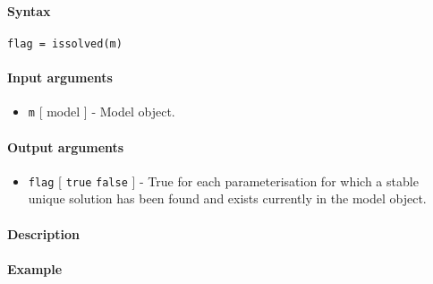 


	\paragraph{Syntax}

\begin{verbatim}
flag = issolved(m)
\end{verbatim}

\paragraph{Input arguments}

\begin{itemize}
\itemsep1pt\parskip0pt
\item
  \texttt{m} {[} model {]} - Model object.
\end{itemize}

\paragraph{Output arguments}

\begin{itemize}
\itemsep1pt\parskip0pt
\item
  \texttt{flag} {[} \texttt{true} \textbar{} \texttt{false} {]} - True
  for each parameterisation for which a stable unique solution has been
  found and exists currently in the model object.
\end{itemize}

\paragraph{Description}

\paragraph{Example}


